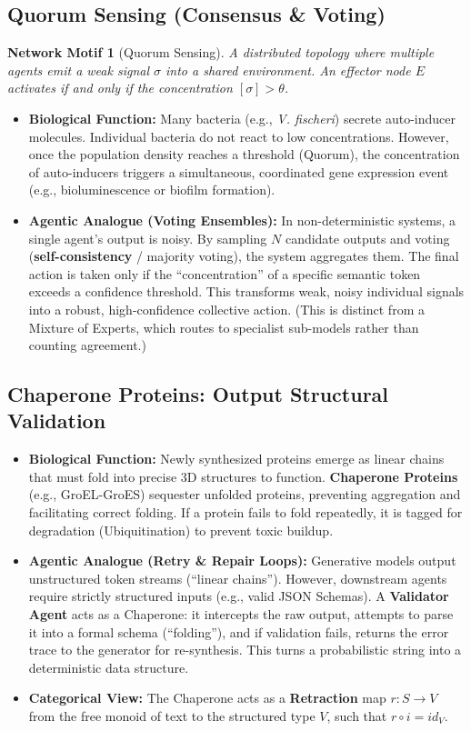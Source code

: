 \documentclass[11pt, a4paper]{article}
\newtheorem{motif}{Network Motif}
\begin{document}
\subsection{Quorum Sensing (Consensus \& Voting)}

\begin{motif}[Quorum Sensing]
A distributed topology where multiple agents emit a weak signal $\sigma$ into a shared environment. An effector node $E$ activates if and only if the concentration $[\sigma] > \theta$.
\end{motif}

\begin{itemize}
    \item \textbf{Biological Function:} Many bacteria (e.g., \textit{V. fischeri}) secrete auto-inducer molecules. Individual bacteria do not react to low concentrations. However, once the population density reaches a threshold (Quorum), the concentration of auto-inducers triggers a simultaneous, coordinated gene expression event (e.g., bioluminescence or biofilm formation).
    \item \textbf{Agentic Analogue (Voting Ensembles):} In non-deterministic systems, a single agent's output is noisy. By sampling $N$ candidate outputs and voting (\textbf{self-consistency} / majority voting), the system aggregates them. The final action is taken only if the ``concentration'' of a specific semantic token exceeds a confidence threshold. This transforms weak, noisy individual signals into a robust, high-confidence collective action. (This is distinct from a Mixture of Experts, which routes to specialist sub-models rather than counting agreement.)
\end{itemize}

\subsection{Chaperone Proteins: Output Structural Validation}
\begin{itemize}
    \item \textbf{Biological Function:} Newly synthesized proteins emerge as linear chains that must fold into precise 3D structures to function. \textbf{Chaperone Proteins} (e.g., GroEL-GroES) sequester unfolded proteins, preventing aggregation and facilitating correct folding. If a protein fails to fold repeatedly, it is tagged for degradation (Ubiquitination) to prevent toxic buildup.
    \item \textbf{Agentic Analogue (Retry \& Repair Loops):} Generative models output unstructured token streams (``linear chains''). However, downstream agents require strictly structured inputs (e.g., valid JSON Schemas). A \textbf{Validator Agent} acts as a Chaperone: it intercepts the raw output, attempts to parse it into a formal schema (``folding''), and if validation fails, returns the error trace to the generator for re-synthesis. This turns a probabilistic string into a deterministic data structure.
    \item \textbf{Categorical View:} The Chaperone acts as a \textbf{Retraction} map $r: S \to V$ from the free monoid of text to the structured type $V$, such that $r \circ i = id_V$.
\end{itemize}
\end{document}
